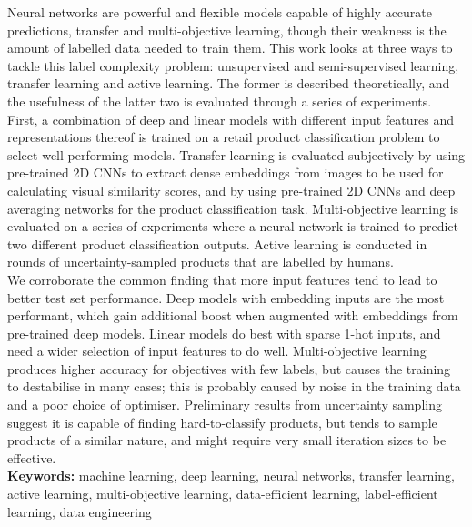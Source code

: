 \noindent
Neural networks are powerful and flexible models capable of highly accurate predictions, transfer and multi-objective learning, though their weakness is the amount of labelled data needed to train them.
This work looks at three ways to tackle this label complexity problem: unsupervised and semi-supervised learning, transfer learning and active learning.
The former is described theoretically, and the usefulness of the latter two is evaluated through a series of experiments.
First, a combination of deep and linear models with different input features and representations thereof is trained on a retail product classification problem to select well performing models.
Transfer learning is evaluated subjectively by using pre-trained 2D CNNs to extract dense embeddings from images to be used for calculating visual similarity scores, and by using pre-trained 2D CNNs and deep averaging networks for the product classification task.
Multi-objective learning is evaluated on a series of experiments where a neural network is trained to predict two different product classification outputs.
Active learning is conducted in rounds of uncertainty-sampled products that are labelled by humans.
\\

We corroborate the common finding that more input features tend to lead to better test set performance.
Deep models with embedding inputs are the most performant, which gain additional boost when augmented with embeddings from pre-trained deep models.
Linear models do best with sparse 1-hot inputs, and need a wider selection of input features to do well.
Multi-objective learning produces higher accuracy for objectives with few labels, but causes the training to destabilise in many cases; this is probably caused by noise in the training data and a poor choice of optimiser.
Preliminary results from uncertainty sampling suggest it is capable of finding hard-to-classify products, but tends to sample products of a similar nature, and might require very small iteration sizes to be effective.
\\

\noindent
\textbf{Keywords:} machine learning, deep learning, neural networks, transfer learning, active learning, multi-objective learning, data-efficient learning, label-efficient learning, data engineering
